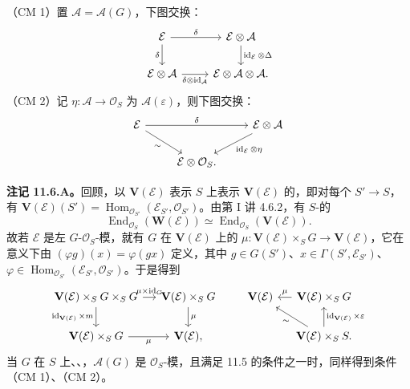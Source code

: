 （CM 1）置 $\mathcal A=\mathcal A(G)$，下图交换：
\[
\begin{tikzcd}
\mathcal E\arrow[r,"\delta"]\arrow[d,"\delta"']&\mathcal E\otimes\mathcal A\arrow[d,"\operatorname{id}_{\mathcal E}\otimes\Delta"]\\
\mathcal E\otimes\mathcal A\arrow[r,"\delta\otimes\operatorname{id}_{\mathcal A}"']&\mathcal E\otimes\mathcal A\otimes\mathcal A.
\end{tikzcd}
\]
（CM 2）记 $\eta:\mathcal A\to\mathcal O_S$ 为 $\mathcal A(\varepsilon)$，则下图交换：
\[
\begin{tikzcd}
\mathcal E\arrow[rr,"\delta"]\arrow[dr,"\sim"']&&\mathcal E\otimes\mathcal A\arrow[dl,"\operatorname{id}_{\mathcal E}\otimes\eta"]\\
&\mathcal E\otimes\mathcal O_S.&
\end{tikzcd}
\]

\textbf{注记 11.6.A。}回顾，以 $\mathbf V(\mathcal E)$ 表示 $S$ 上表示 $\mathbf V(\mathcal E)$ 的，即对每个 $S'\to S$，有 $\mathbf V(\mathcal E)(S')=\operatorname{Hom}_{\mathcal O_{S'}}(\mathcal E_{S'},\mathcal O_{S'})$。由第 I 讲 4.6.2，有 $S$-的
\[
\operatorname{End}_{\mathcal O_S}(\mathbf W(\mathcal E))\simeq\operatorname{End}_{\mathcal O_S}(\mathbf V(\mathcal E)).
\]
故若 $\mathcal E$ 是左 $G$-$\mathcal O_S$-模，就有 $G$ 在 $\mathbf V(\mathcal E)$ 上的 $\mu:\mathbf V(\mathcal E)\times_S G\to\mathbf V(\mathcal E)$，它在意义下由 $(\varphi g)(x)=\varphi(gx)$ 定义，其中 $g\in G(S')$、$x\in\Gamma(S',\mathcal E_{S'})$、$\varphi\in\operatorname{Hom}_{\mathcal O_{S'}}(\mathcal E_{S'},\mathcal O_{S'})$。于是得到
\[
\begin{tikzcd}[column sep=small]
\mathbf V(\mathcal E)\times_S G\times_S G\arrow[r,"\mu\times\operatorname{id}_G"]\arrow[d,"\operatorname{id}_{\mathbf V(\mathcal E)}\times m"']&\mathbf V(\mathcal E)\times_S G\arrow[d,"\mu"]\\
\mathbf V(\mathcal E)\times_S G\arrow[r,"\mu"']&\mathbf V(\mathcal E),
\end{tikzcd}
\qquad
\begin{tikzcd}[column sep=small]
\mathbf V(\mathcal E)&\mathbf V(\mathcal E)\times_S G\arrow[l,"\mu"']\\
&\mathbf V(\mathcal E)\times_S S\arrow[u,"\operatorname{id}_{\mathbf V(\mathcal E)}\times\varepsilon"']\arrow[ul,"\sim"].
\end{tikzcd}
\]
当 $G$ 在 $S$ 上、、，$\mathcal A(G)$ 是 $\mathcal O_S$-模，且满足 11.5 的条件之一时，同样得到条件（CM 1）、（CM 2）。

